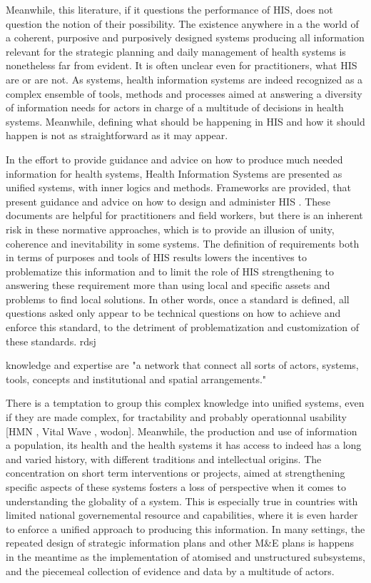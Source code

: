 \documentclass[letterpaper, 10 pt, conference]{IEEEconf}  %
\begin{document}
Meanwhile, this literature, if it questions the performance of HIS, does not question the notion of their possibility. The existence anywhere in a the world of a coherent, purposive and purposively designed systems producing all information relevant for the strategic planning and daily management of health systems is nonetheless far from evident. It is often unclear even for practitioners, what HIS are or are not. As systems, health information systems are indeed recognized as a complex ensemble of tools, methods and processes aimed at answering a diversity of information needs for actors in charge of a multitude of decisions in health systems. Meanwhile, defining what should be happening in HIS and how it should happen is not as straightforward as it may appear.

In the effort to provide guidance and advice on how to produce much needed information for health systems, Health Information Systems are presented as unified systems, with inner logics and methods. Frameworks are provided, that present guidance and advice on how to design and administer HIS \cite{health_metrics_network_framework_2008}. These documents are helpful for practitioners and field workers, but there is an inherent risk in these normative approaches, which is to provide an illusion of unity, coherence and inevitability in some systems. The definition of requirements both in terms of purposes and tools of HIS results lowers the incentives to problematize this information and to limit the role of HIS strengthening to answering these requirement more than using local and specific assets and problems to find local solutions. In other words, once a standard is defined, all questions asked only appear to be technical questions on how to achieve and enforce this standard, to the detriment of problematization and customization of these standards. rdsj

knowledge and expertise are "a network that connect all sorts of actors, systems, tools, concepts and institutional and spatial arrangements." \cite{bergeron_savoirs_2014}

There is a temptation to group this complex knowledge into unified systems, even if they are made complex, for tractability and probably operationnal usability \cite{health_metrics_network_framework_2008} \cite{vital_wave_consulting_health_2009} \cite{daltilia_systeme_2005} [HMN , Vital Wave , wodon]. Meanwhile, the production and use of information a population, its health and the health systems it has access to indeed has a long and varied history, with different traditions and intellectual origins. The concentration on short term interventions or projects, aimed at strengthening specific aspects of these systems fosters a loss of perspective when it comes to understanding the globality of a system. This is especially true in countries with limited national governemental resource and capabilities, where it is even harder to enforce a unified approach to producing this information. In many settings, the repeated design of strategic information plans and other M\&E plans is happens in the meantime as the implementation of atomised and unstructured subsystems, and the piecemeal collection of  evidence and data by a multitude of actors.
\end{document}
